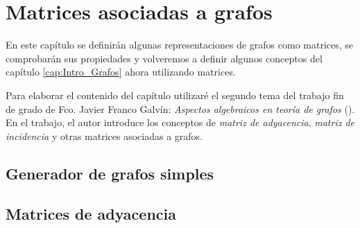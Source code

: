 \chapter{Matrices asociadas a grafos}

En este capítulo se definirán algunas representaciones de grafos como matrices,
se comprobarán sus propiedades y volveremos a definir algunos conceptos del 
capítulo \ref{cap:Intro_Grafos} ahora utilizando matrices.

Para elaborar el contenido del capítulo utilizaré el segundo tema del trabajo
fin de grado de Fco. Javier Franco Galvín: \textit{Aspectos algebraicos en
teoría de grafos} (\cite{Franco-tfg}). En el trabajo, el autor introduce los 
conceptos de \textit{matriz de adyacencia}, \textit{matriz de incidencia} y 
otras matrices asociadas a grafos.

\section{Generador de grafos simples}


\section{Matrices de adyacencia}



